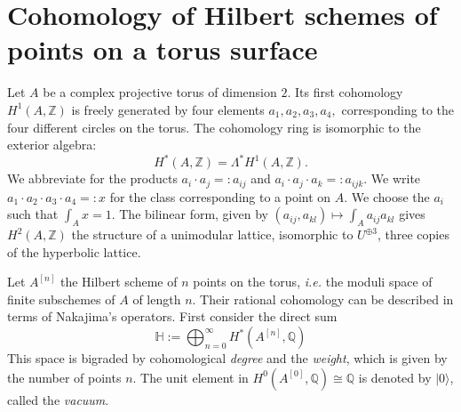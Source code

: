 \documentclass{amsart}
\newcommand{\hilb}[1]{^{[#1]}}
\newcommand{\ie}{{\it i.e. }}
\newcommand{\vac}{|0\rangle}
\renewcommand{\H}{\mathbb{H}}
\newcommand{\Q}{\mathbb{Q}}
\newcommand{\Z}{\mathbb{Z}}
\theoremstyle{plain}
\theoremstyle{definition}
\theoremstyle{remark}
\begin{document}
\section{Cohomology of Hilbert schemes of points on a torus surface}
Let $A$ be a complex projective torus of dimension $2$. Its first cohomology $H^1(A,\Z)$ is freely generated by four elements $a_1,a_2,a_3,a_4,$ corresponding to the four different circles on the torus. The cohomology ring is isomorphic to the exterior algebra:
$$
H^*(A,\Z) = \Lambda^* H^1(A,\Z).
$$
We abbreviate for the products $a_i\cdot a_j =: a_{ij}$ and $a_i\cdot a_j\cdot a_k =: a_{ijk}$. We write $a_1\cdot a_2\cdot a_3 \cdot a_4 =:x$ for the class corresponding to a point on $A$. We choose the $a_i$ such that $\int_A x = 1$.
The bilinear form, given by $(a_{ij},a_{kl})\mapsto\int_A a_{ij}a_{kl}$ gives $H^2(A,\Z)$ the structure of a unimodular lattice, isomorphic to $U^{\oplus 3}$, three copies of the hyperbolic lattice. 

Let $A\hilb{n}$ the Hilbert scheme of $n$ points on the torus, \ie the moduli space of finite subschemes of $A$ of length $n$. Their rational cohomology can be described in terms of Nakajima's operators. First consider the direct sum
$$
\H := \bigoplus_{n=0}^{\infty} H^*(A\hilb{n},\Q)
$$
This space is bigraded by cohomological \emph{degree} and the \emph{weight}, which is given by the number of points $n$. The unit element in $H^0(A\hilb{0},\Q) \cong \Q$ is denoted by $\vac$, called the \emph{vacuum}.
\end{document}
